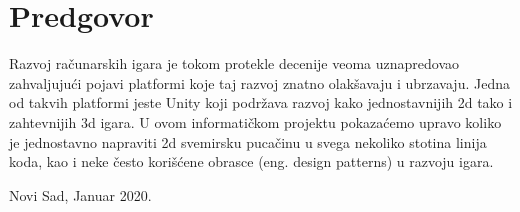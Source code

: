 \clearpage
\justify
\thispagestyle{empty}
\section*{Predgovor}

Razvoj ra\v{c}unarskih igara je tokom protekle decenije veoma uznapredovao zahvaljuju\'ci pojavi
platformi koje taj razvoj znatno olak\v{s}avaju i ubrzavaju. Jedna od takvih platformi jeste Unity koji
podr\v{z}ava razvoj kako jednostavnijih 2d tako i zahtevnijih 3d igara. U ovom informati\v{c}kom projektu
pokaza\'cemo upravo koliko je jednostavno napraviti 2d svemirsku puca\v{c}inu u svega nekoliko stotina
linija koda, kao i neke \v{c}esto kori\v{s}\'cene obrasce (eng. design patterns) u razvoju igara.

\vspace{3cm}
\noindent
\textbf{\thesisauthor{}} 

\vspace{0.2cm}
\noindent
Novi Sad, Januar 2020.